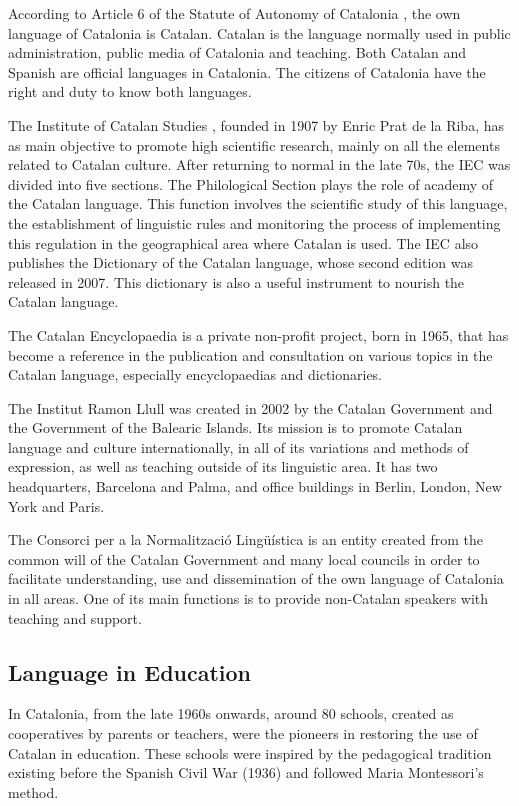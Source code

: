 \begin{multicols}{2}
According to Article 6 of the Statute of Autonomy of Catalonia \cite{CAT-estatut}, the own language of Catalonia is Catalan. Catalan is the language normally used in public administration, public media of Catalonia and teaching. Both Catalan and Spanish are official languages in Catalonia. The citizens of Catalonia have the right and duty to know both languages.

The Institute of Catalan Studies \cite{CAT-IEC}, founded in 1907 by Enric Prat de la Riba, has as main objective to promote high scientific research, mainly on all the elements related to Catalan culture. After returning to normal in the late 70s, the IEC was divided into five sections. The Philological Section plays the role of academy of the Catalan language. This function involves the scientific study of this language, the establishment of linguistic rules and monitoring the process of implementing this regulation in the geographical area where Catalan is used. The IEC also publishes the Dictionary of the Catalan language, whose second edition was released in 2007. This dictionary is also a useful instrument to nourish the Catalan language.

The Catalan Encyclopaedia \cite{CAT-enciclopedia} is a private non-profit project, born in 1965, that has become a reference in the publication and consultation on various topics in the Catalan language, especially encyclopaedias and dictionaries.

The Institut Ramon Llull \cite{CAT-Nota12} was created in 2002 by the Catalan Government and the Government of the Balearic Islands. Its mission is to promote Catalan language and culture internationally, in all of its variations and methods of expression, as well as teaching outside of its linguistic area. It has two headquarters, Barcelona and Palma, and office buildings in Berlin, London, New York and Paris.

The Consorci per a la Normalització Lingüística \cite{CAT-cpnl} is an entity created from the common will of the Catalan Government and many local councils in order to facilitate understanding, use and dissemination of the own language of Catalonia in all areas. One of its main functions is to provide non-Catalan speakers with teaching and support.

\subsection{Language in Education}

In Catalonia, from the late 1960s onwards, around 80 schools, created as cooperatives by parents or teachers, were the pioneers in restoring the use of Catalan in education. These schools were inspired by the pedagogical tradition existing before the Spanish Civil War (1936) and followed Maria Montessori's method.


\end{multicols}
